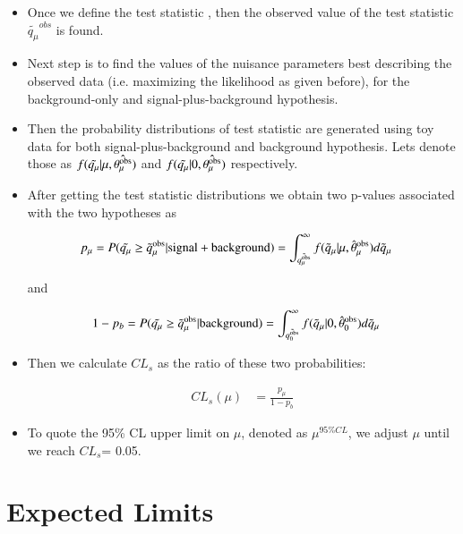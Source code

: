\begin{itemize}
\item Once we define the test statistic , then the observed value of the test statistic $\tilde{q_{\mu}}^{obs}$ is found. 


\item Next step is to find the values  of  the  nuisance  parameters best  describing  the observed data (i.e.  maximizing the likelihood as given before), for the background-only and signal-plus-background hypothesis.


\item Then the probability distributions of test statistic are generated using toy data for both signal-plus-background  and background  hypothesis. Lets denote those as $f(\tilde{q_{\mu}} | \mu, \hat{\theta_{\mu}^{\rm obs}})$ and $f(\tilde{q_{\mu}} | 0, \hat{\theta_{\mu}^{\rm obs}})$ respectively.

 
\item After getting the test statistic distributions we obtain two p-values associated with the two hypotheses as 

\begin{align}
p_{\mu} & = P(\tilde{q_{\mu}} \geq \tilde{q}_{\mu}^{\rm obs} | {\rm signal+background}) = \int_{\tilde{q_{\mu}^{\rm obs}}}^{\infty} f(\tilde{q}_{\mu} | \mu, \hat{\theta}_{\mu}^{\rm obs}) d\tilde{q}_{\mu}
\label{eq:pvaluesplusb}
\end{align}

and 

\begin{align}
1 - p_{b} & = P(\tilde{q_{\mu}} \geq \tilde{q}_{\mu}^{\rm obs} | {\rm background}) = \int_{\tilde{q_{0}^{\rm obs}}}^{\infty} f(\tilde{q}_{\mu} | 0, \hat{\theta}_{0}^{\rm obs}) d\tilde{q}_{\mu}
\label{eq:pvalueb}
\end{align}

\item Then we calculate $CL_{s}$ as the ratio of these two probabilities:

\begin{align}
CL_{s}(\mu) & = \frac{p_{\mu}}{1 - p_{b}}
\label{eq:CLs}
\end{align}

\item To quote the 95\%  CL  upper  limit  on $\mu$,  denoted  as $\mu^{95\%CL}$, we adjust $\mu$ until we reach $CL_{s}$= 0.05.

\end{itemize}


\section{Expected Limits }

